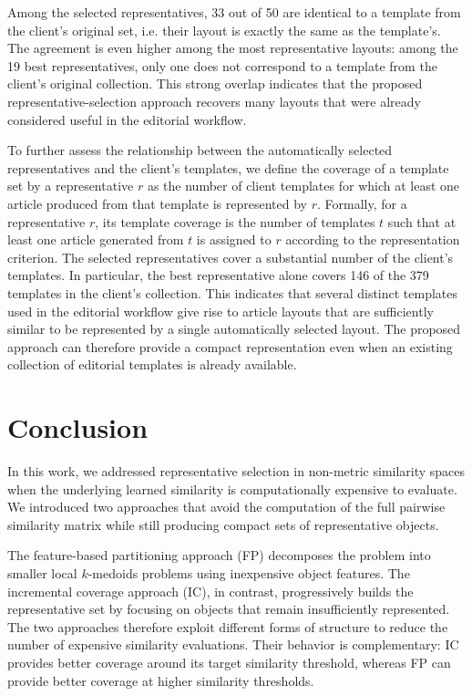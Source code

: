 \documentclass{ieeeaccess}
\newcommand{\toblack}{\color{black}}
\newcommand{\tored}{\color{red}}
\newcommand{\pk}[1]{{\tored [{\bfseries Pierre}: {\itshape #1}] \toblack}}
\newcommand{\partitioning}{FP\xspace}
\newcommand{\inclusion}{IC\xspace}
\begin{document}
Among the selected representatives, 33 out of 50 are identical
to a template from the client's original set, i.e. their layout is exactly the same as the template's.
The agreement is even higher among the most representative layouts: among the 19 best representatives, only one does not correspond to a template from the client's original collection. This strong overlap indicates that the proposed representative-selection approach recovers many layouts that were already considered useful in the editorial workflow.

To further assess the relationship between the automatically selected representatives and the client's templates, we define the coverage of a template set by a representative $r$ as the number of client templates for which at least one article produced from that template is represented by $r$. Formally, for a representative $r$, its template coverage is the number of templates $t$ such that at least one article generated from $t$ is assigned to $r$ according to the representation criterion. The selected representatives cover a substantial number of the client's templates. In particular, the best representative alone covers 146 of the 379 templates in the client's collection. 
This indicates that several distinct templates used in the editorial workflow give rise to article layouts that are sufficiently similar to be represented by a single automatically selected layout. The proposed approach can therefore provide a compact representation even when an existing collection of editorial templates is already available.

\section{Conclusion}
\label{sec:conclusion}

In this work, we addressed representative selection in non-metric similarity spaces when the underlying learned similarity is computationally expensive to evaluate. We introduced two approaches that avoid the computation of the full pairwise similarity matrix while still producing compact sets of representative objects.

The feature-based partitioning approach (\partitioning) decomposes the problem into smaller local $k$-medoids problems using inexpensive object features. The incremental coverage approach (\inclusion), in contrast, progressively builds the representative set by focusing on objects that remain insufficiently represented. The two approaches therefore exploit different forms of structure to reduce the number of expensive similarity evaluations. Their behavior is complementary: \inclusion provides better coverage around its target similarity threshold, whereas \partitioning can provide better coverage at higher similarity thresholds.
\end{document}
